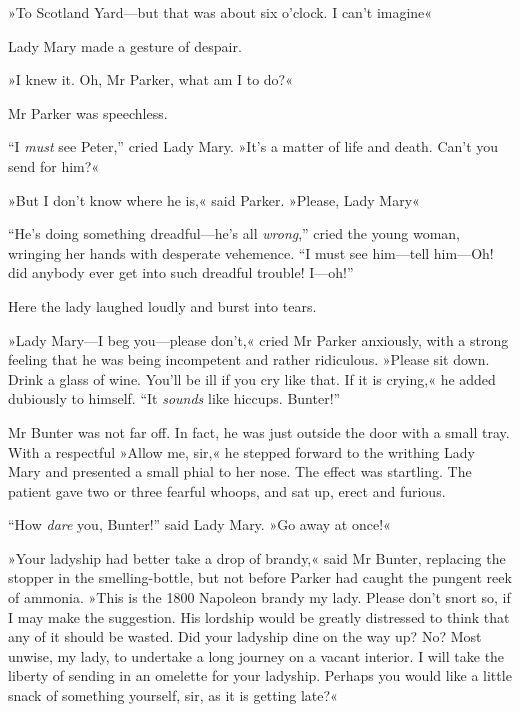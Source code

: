 »To Scotland Yard\allowbreak---\allowbreak but that was about six o'clock. I can't imagine\longdash«

Lady Mary made a gesture of despair.

»I knew it. Oh, Mr Parker, what am I to do?«

Mr Parker was speechless.

\enquote{I \textit{must} see Peter,} cried Lady Mary. »It's a matter of life and death. Can't you send for him?«

»But I don't know where he is,« said Parker. »Please, Lady Mary\longdash«

\enquote{He's doing something dreadful\allowbreak---\allowbreak he's all \textit{wrong},} cried the young woman, wringing her hands with desperate vehemence. \enquote{I must see him\allowbreak---\allowbreak tell him\allowbreak---\allowbreak Oh! did anybody ever get into such dreadful trouble!
I\allowbreak---\allowbreak oh!\longdash}

Here the lady laughed loudly and burst into tears.

»Lady Mary\allowbreak---\allowbreak I beg you\allowbreak---\allowbreak please don't,« cried Mr Parker anxiously, with a strong feeling that he was being incompetent and rather ridiculous.  »Please sit down. Drink a glass of wine. You'll be ill if you cry like that. If it is crying,« he added dubiously to himself. \enquote{It \textit{sounds} like hiccups. Bunter!}

Mr Bunter was not far off. In fact, he was just outside the door with a small tray. With a respectful »Allow me, sir,« he stepped forward to the writhing Lady Mary and presented a small phial to her nose. The effect was startling. The patient gave two or three fearful whoops, and sat up, erect and furious.

\enquote{How \textit{dare} you, Bunter!} said Lady Mary. »Go away at once!«

»Your ladyship had better take a drop of brandy,« said Mr Bunter, replacing the stopper in the smelling-bottle, but not before Parker had caught the pungent reek of ammonia. »This is the 1800 Napoleon brandy my lady. Please don't snort so, if I may make the suggestion.  His lordship would be greatly distressed to think that any of it should be wasted. Did your ladyship dine on the way up? No? Most unwise, my lady, to undertake a long journey on a vacant interior. I will take the liberty of sending in an omelette for your ladyship. Perhaps you would like a little snack of something yourself, sir, as it is getting late?«

